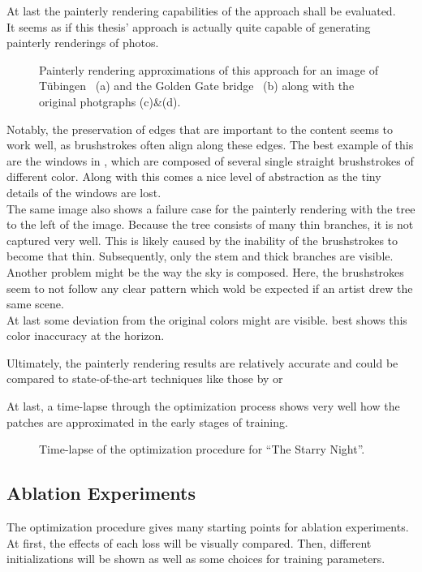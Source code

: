 At last the painterly rendering capabilities of the approach shall be evaluated.\\
It seems as if this thesis' approach is actually quite capable of generating painterly renderings of photos.
\begin{figure*}
    \caption[]{Painterly rendering approximations of this approach for an image of Tübingen~\cite{tub} (a) and the Golden Gate bridge~\cite{GGB} (b) along with the original photgraphs (c)\&(d).}
\end{figure*}
Notably, the preservation of edges that are important to the content seems to work well, as brushstrokes often align along these edges.
The best example of this are the windows in , which are composed of several single straight brushstrokes of different color.
Along with this comes a nice level of abstraction as the tiny details of the windows are lost.\\
The same image also shows a failure case for the painterly rendering with the tree to the left of the image.
Because the tree consists of many thin branches, it is not captured very well.
This is likely caused by the inability of the brushstrokes to become that thin.
Subsequently, only the stem and thick branches are visible.\\
Another problem might be the way the sky is composed.
Here, the brushstrokes seem to not follow any clear pattern which wold be expected if an artist drew the same scene.\\
At last some deviation from the original colors might are visible.
 best shows this color inaccuracy at the horizon.

Ultimately, the painterly rendering results are relatively accurate and could be compared to state-of-the-art techniques like those by \citeauthor*{paintbot} or \citeauthor*{hertzmann}

At last, a time-lapse through the optimization process shows very well how the patches are approximated in the early stages of training.
\begin{figure*}
    \caption[]{Time-lapse of the optimization procedure for ``The Starry Night''.}
\end{figure*}

\subsection{Ablation Experiments}
The optimization procedure gives many starting points for ablation experiments.
At first, the effects of each loss will be visually compared.
Then, different initializations will be shown as well as some choices for training
parameters.

